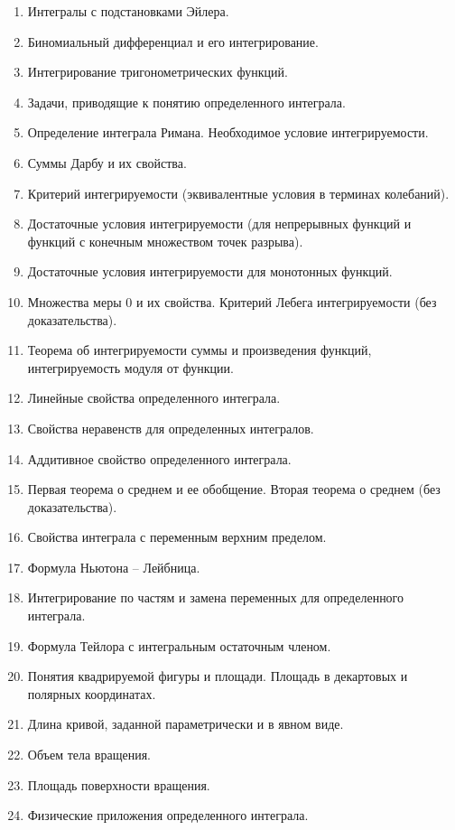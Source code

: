 \documentclass{article}
\begin{document}
\begin{enumerate}
    \item Интегралы с подстановками Эйлера. 
    \item Биномиальный дифференциал и его интегрирование. 
    \item Интегрирование тригонометрических функций. 
    \item Задачи, приводящие к понятию определенного интеграла. 
    \item Определение интеграла Римана. Необходимое условие интегрируемости. 
    \item Суммы Дарбу и их свойства. 
    \item Критерий интегрируемости (эквивалентные условия в терминах колебаний). 
    \item Достаточные условия интегрируемости (для непрерывных функций и функций с конечным множеством точек разрыва). 
    \item Достаточные условия интегрируемости для монотонных функций. 
    \item Множества меры 0 и их свойства. Критерий Лебега интегрируемости (без доказательства). 
    \item Теорема об интегрируемости суммы и произведения функций, интегрируемость модуля от функции. 
    \item Линейные свойства определенного интеграла. 
    \item Свойства неравенств для определенных интегралов. 
    \item Аддитивное свойство определенного интеграла. 
    \item Первая теорема о среднем и ее обобщение. Вторая теорема о среднем (без доказательства). 
    \item Свойства интеграла с переменным верхним пределом. 
    \item Формула Ньютона – Лейбница.
    \item Интегрирование по частям и замена переменных для определенного интеграла. 
    \item Формула Тейлора с интегральным остаточным членом. 
    \item Понятия квадрируемой фигуры и площади. Площадь в декартовых и полярных координатах. 
    \item Длина кривой, заданной параметрически и в явном виде. 
    \item Объем тела вращения. 
    \item Площадь поверхности вращения. 
    \item Физические приложения определенного интеграла.
\end{enumerate}
\end{document}
